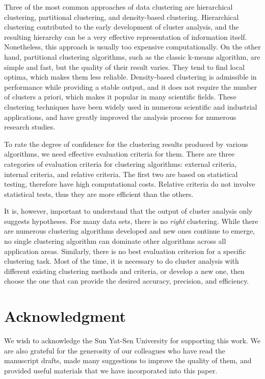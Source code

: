 \documentclass[conference]{IEEEtran}
\begin{document}
Three of the most common approaches of data clustering are hierarchical clustering, partitional clustering, and density-based clustering. Hierarchical clustering contributed to the early development of cluster analysis, and the resulting hierarchy can be a very effective representation of information itself. Nonetheless, this approach is usually too expensive computationally. On the other hand, partitional clustering algorithms, such as the classic k-means algorithm, are simple and fast, but the quality of their result varies. They tend to find local optima, which makes them less reliable. Density-based clustering is admissible in performance while providing a stable output, and it does not require the number of clusters a priori, which makes it popular in many scientific fields. These clustering techniques have been widely used in numerous scientific and industrial applications, and have greatly improved the analysis process for numerous research studies.

To rate the degree of confidence for the clustering results produced by various algorithms, we need effective evaluation criteria for them. There are three categories of evaluation criteria for clustering algorithms: external criteria, internal criteria, and relative criteria. The first two are based on statistical testing, therefore have high computational costs. Relative criteria do not involve statistical tests, thus they are more efficient than the others.

It is, however, important to understand that the output of cluster analysis only suggests hypotheses. For many data sets, there is no \textit{right} clustering. While there are numerous clustering algorithms developed and new ones continue to emerge, no single clustering algorithm can dominate other algorithms across all application areas. Similarly, there is no best evaluation criterion for a specific clustering task. Most of the time, it is necessary to do cluster analysis with different existing clustering methods and criteria, or develop a new one, then choose the one that can provide the desired accuracy, precision, and efficiency.

\section*{Acknowledgment}

We wish to acknowledge the Sun Yat-Sen University for supporting this work. We are also grateful for the generosity of our colleagues who have read the manuscript drafts, made many suggestions to improve the quality of them, and provided useful materials that we have incorporated into this paper. 



\end{document}
